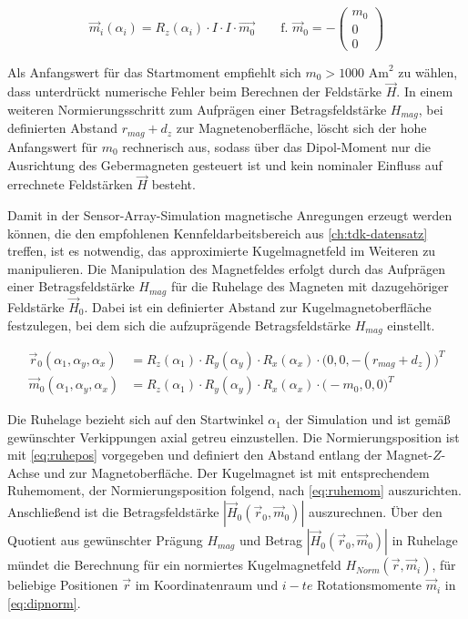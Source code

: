\begin{equation}\label{eq:zrotov}
\vec{m}_i(\alpha_i)  = R_z(\alpha_i) \cdot I \cdot I \cdot \vec{m_0}  \qquad \textrm{f. } \vec{m}_0 = -\begin{pmatrix} m_0\\0\\0 \end{pmatrix}
\end{equation}


Als Anfangswert für das Startmoment empfiehlt sich $m_0 > 1000 \text{ Am}^2$ zu wählen, dass unterdrückt numerische Fehler beim Berechnen der Feldstärke $\vec{H}$. In einem weiteren Normierungsschritt zum Aufprägen einer Betragsfeldstärke $H_{mag}$, bei definierten Abstand $r_{mag} + d_z$ zur Magnetenoberfläche, löscht sich der hohe Anfangswert für $m_0$ rechnerisch aus, sodass über das Dipol-Moment nur die Ausrichtung des Gebermagneten gesteuert ist und kein nominaler Einfluss auf errechnete Feldstärken $\vec{H}$ besteht.


\clearpage


Damit in der Sensor-Array-Simulation magnetische Anregungen erzeugt werden können, die den empfohlenen Kennfeldarbeitsbereich aus \autoref{ch:tdk-datensatz} treffen, ist es notwendig, das approximierte Kugelmagnetfeld im Weiteren zu manipulieren. Die Manipulation des Magnetfeldes erfolgt durch das Aufprägen einer Betragsfeldstärke $H_{mag}$ für die Ruhelage des Magneten mit dazugehöriger Feldstärke $\vec{H}_0$. Dabei ist ein definierter Abstand zur Kugelmagnetoberfläche festzulegen, bei dem sich die aufzuprägende Betragsfeldstärke $H_{mag}$ einstellt. 


\begin{align}\label{eq:ruhepos}
	\vec{r}_0(\alpha_1,\alpha_y,\alpha_x) &= R_z(\alpha_1) \cdot R_y(\alpha_y) \cdot R_x(\alpha_x) \cdot \big(0,0,-(r_{mag} + d_z)\big)^T \\
	\label{eq:ruhemom}
	\vec{m}_0(\alpha_1,\alpha_y,\alpha_x) &= R_z(\alpha_1) \cdot R_y(\alpha_y) \cdot R_x(\alpha_x) \cdot \big(-m_0,0,0\big)^T
\end{align}


Die Ruhelage bezieht sich auf den Startwinkel $\alpha_1$ der Simulation und ist gemäß gewünschter Verkippungen axial getreu einzustellen. Die Normierungsposition ist mit \autoref{eq:ruhepos} vorgegeben und definiert den Abstand entlang der Magnet-$Z$-Achse und zur Magnetoberfläche. Der Kugelmagnet ist mit entsprechendem Ruhemoment, der Normierungsposition folgend, nach \autoref{eq:ruhemom} auszurichten. Anschließend ist die Betragsfeldstärke $|\vec{H}_0(\vec{r}_0,\vec{m}_0)|$ auszurechnen. Über den Quotient aus gewünschter Prägung $H_{mag}$ und Betrag $|\vec{H}_0(\vec{r}_0,\vec{m}_0)|$ in Ruhelage mündet die Berechnung für ein normiertes Kugelmagnetfeld $H_{Norm}(\vec{r},\vec{m}_i)$, für beliebige Positionen $\vec{r}$ im Koordinatenraum und $i-te$ Rotationsmomente $\vec{m}_i$ in \autoref{eq:dipnorm}.


